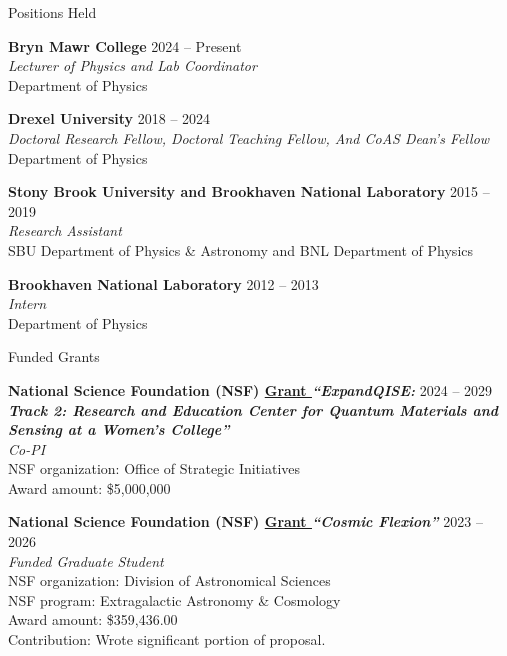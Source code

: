 \documentclass{resume} %
\begin{document}
\begin{rSection}{Positions Held}

\textbf{Bryn Mawr College} \hfill 2024 -- Present \\
\textit{Lecturer of Physics and Lab Coordinator} \\
Department of Physics
  
\textbf{Drexel University} \hfill {2018 -- 2024} \\
\textit{Doctoral Research Fellow, Doctoral Teaching Fellow, And CoAS Dean's Fellow}\\
Department of Physics

\textbf{Stony Brook University and Brookhaven National Laboratory} \hfill {2015 -- 2019}\\
\textit{Research Assistant}\\
SBU Department of Physics \& Astronomy  and BNL Department of Physics

\textbf{Brookhaven National Laboratory} \hfill {2012 -- 2013}\\
\textit{Intern}\\
Department of Physics

\end{rSection}


\begin{rSection}{Funded Grants}

  \textbf{National Science Foundation (NSF) \href{https://www.nsf.gov/awardsearch/showAward?AWD_ID=2427091}{Grant }} \textbf{\textit{``ExpandQISE:}} \hfill {2024 -- 2029} \\
\textbf{\textit{Track 2:  Research and Education Center for Quantum Materials and\\ Sensing  at a  Women's College''}}\\ 
\textit{Co-PI}\\
NSF organization: Office of Strategic Initiatives\\
Award amount: \$5,000,000
  
\textbf{National Science Foundation (NSF) \href{https://www.nsf.gov/awardsearch/showAward?AWD_ID=2306989&HistoricalAwards=false}{Grant } \textit{``Cosmic Flexion''}} \hfill {2023 -- 2026} \\
\textit{Funded Graduate Student}\\
NSF organization: Division of Astronomical Sciences\\
NSF program: Extragalactic Astronomy \& Cosmology\\
Award amount: \$359,436.00\\
Contribution: Wrote significant portion of proposal.

\end{rSection}
\end{document}

